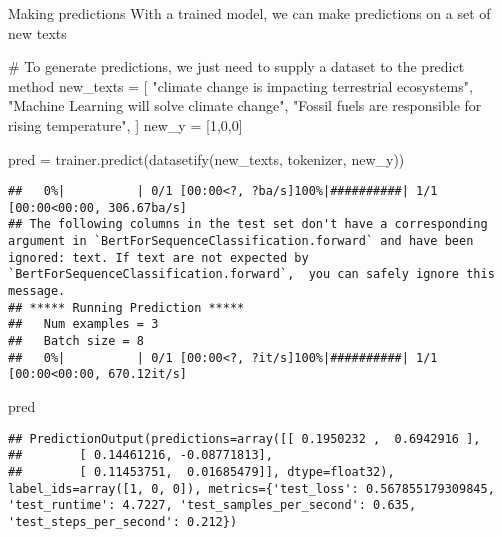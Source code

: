 \documentclass[
  10pt,
  ignorenonframetext,
  aspectratio=169]{beamer}
\newenvironment{Shaded}{\begin{snugshade}}{\end{snugshade}}
\newcommand{\CommentTok}[1]{\textcolor[rgb]{0.50,0.62,0.50}{#1}}
\newcommand{\DecValTok}[1]{\textcolor[rgb]{0.86,0.86,0.80}{#1}}
\newcommand{\NormalTok}[1]{\textcolor[rgb]{0.80,0.80,0.80}{#1}}
\newcommand{\OperatorTok}[1]{\textcolor[rgb]{0.94,0.94,0.82}{#1}}
\newcommand{\StringTok}[1]{\textcolor[rgb]{0.80,0.58,0.58}{#1}}
\begin{document}
\begin{frame}[fragile]{Making predictions}
\protect\hypertarget{making-predictions}{}
With a trained model, we can make predictions on a set of new texts

\medskip
\scriptsize

\begin{Shaded}
\begin{Highlighting}[]
\CommentTok{\# To generate predictions, we just need to supply a dataset to the predict method}
\NormalTok{new\_texts }\OperatorTok{=}\NormalTok{ [}
    \StringTok{"climate change is impacting terrestrial ecosystems"}\NormalTok{,}
    \StringTok{"Machine Learning will solve climate change"}\NormalTok{,}
    \StringTok{"Fossil fuels are responsible for rising temperature"}\NormalTok{,}
\NormalTok{]}
\NormalTok{new\_y }\OperatorTok{=}\NormalTok{ [}\DecValTok{1}\NormalTok{,}\DecValTok{0}\NormalTok{,}\DecValTok{0}\NormalTok{]}

\NormalTok{pred }\OperatorTok{=}\NormalTok{ trainer.predict(datasetify(new\_texts, tokenizer, new\_y))}
\end{Highlighting}
\end{Shaded}

\begin{verbatim}
##   0%|          | 0/1 [00:00<?, ?ba/s]100%|##########| 1/1 [00:00<00:00, 306.67ba/s]
## The following columns in the test set don't have a corresponding argument in `BertForSequenceClassification.forward` and have been ignored: text. If text are not expected by `BertForSequenceClassification.forward`,  you can safely ignore this message.
## ***** Running Prediction *****
##   Num examples = 3
##   Batch size = 8
##   0%|          | 0/1 [00:00<?, ?it/s]100%|##########| 1/1 [00:00<00:00, 670.12it/s]
\end{verbatim}

\begin{Shaded}
\begin{Highlighting}[]
\NormalTok{pred}
\end{Highlighting}
\end{Shaded}

\begin{verbatim}
## PredictionOutput(predictions=array([[ 0.1950232 ,  0.6942916 ],
##        [ 0.14461216, -0.08771813],
##        [ 0.11453751,  0.01685479]], dtype=float32), label_ids=array([1, 0, 0]), metrics={'test_loss': 0.567855179309845, 'test_runtime': 4.7227, 'test_samples_per_second': 0.635, 'test_steps_per_second': 0.212})
\end{verbatim}
\end{frame}
\end{document}

